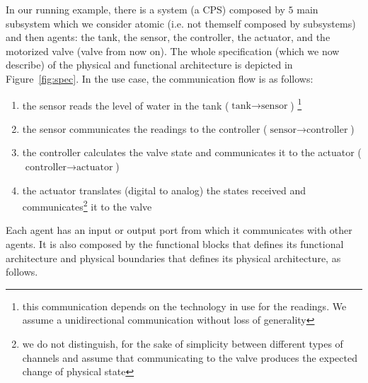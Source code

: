 In our running example, there is a system (a CPS) composed by $5$ main
subsystem which we consider atomic (i.e. not themself composed by subsystems)
and then agents: the tank, the sensor, the controller, the actuator, and the
motorized valve (valve from now on).  The whole specification (which we now
describe) of the physical and functional architecture is depicted in
Figure~\ref{fig:spec}.  In the use case, the communication flow is as follows:
\begin{enumerate}
	\item the sensor reads the level of water in the tank ($\text{tank}\rightarrow \text{sensor}$) \footnote{this communication depends on the technology in use for the readings. We assume a unidirectional communication without loss of generality}
	\item the sensor communicates the readings to the controller ($\text{sensor}\rightarrow \text{controller}$)
	\item the controller calculates the valve state and communicates it to the actuator ($\text{controller}\rightarrow \text{actuator}$)
	\item the actuator translates (digital to analog) the states received and communicates\footnote{we do not distinguish, for the sake of simplicity between different types of channels and assume that communicating to the valve produces the expected change of physical state} it to the valve
\end{enumerate}
Each agent has an input or output port from which it communicates with other
agents.  It is also composed by the functional blocks that defines its
functional architecture and physical boundaries that defines its physical
architecture, as follows.
